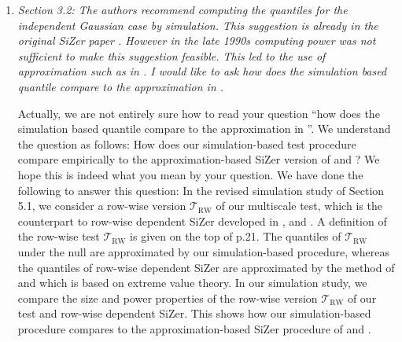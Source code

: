 \documentclass[a4paper,12pt]{article}
\begin{document}
\begin{enumerate}[label=(\arabic*),leftmargin=0.7cm]

\item \textit{Section 3.2: The authors recommend computing the quantiles for the independent Gaussian case by simulation. This suggestion is already in the original SiZer paper \citep{ChaudhuriMarron1999}. However in the late 1990s computing power was not sufficient to make this suggestion feasible. This led to the use of approximation such as in \cite{HannigMarron2006}. I would like to ask how does the simulation based quantile compare to the approximation in \cite{HannigMarron2006}.} 

Actually, we are not entirely sure how to read your question ``how does the simulation based quantile compare to the approximation in \cite{HannigMarron2006}''. We understand the question as follows: How does our simulation-based test procedure compare empirically to the approximation-based SiZer version of \cite{HannigMarron2006} and \cite{ParkHannigKang2009}? We hope this is indeed what you mean by your question. \newline
%
We have done the following to answer this question: In the revised simulation study of Section 5.1, we consider a row-wise version $\mathcal{T}_{\text{RW}}$ of our multiscale test, which is the counterpart to row-wise dependent SiZer developed in \cite{Rondonotti2004}, \cite{Rondonotti2007} and \cite{ParkHannigKang2009}. A definition of the row-wise test $\mathcal{T}_{\text{RW}}$ is given on the top of p.21. The quantiles of $\mathcal{T}_{\text{RW}}$ under the null are approximated by our simulation-based procedure, whereas the quantiles of row-wise dependent SiZer are approximated by the method of \cite{HannigMarron2006} and \cite{ParkHannigKang2009} which is based on extreme value theory. In our simulation study, we compare the size and power properties of the row-wise version $\mathcal{T}_{\text{RW}}$ of our test and row-wise dependent SiZer. This shows how our simulation-based procedure compares to the approximation-based SiZer procedure of \cite{HannigMarron2006} and \cite{ParkHannigKang2009}. 


\end{enumerate}
\end{document}
